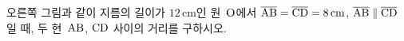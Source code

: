 \noindent\begin{minipage}[t]{0.58\linewidth}\vspace{0pt}\raggedright 오른쪽 그림과 같이 지름의 길이가 $12\,\mathrm{cm}$인 원~$\mathrm{O}$에서 $\overline{\mathrm{AB}}=\overline{\mathrm{CD}}=8\,\mathrm{cm}$, $\overline{\mathrm{AB}}\parallel\overline{\mathrm{CD}}$일 때, 두 현~$\mathrm{AB}$, $\mathrm{CD}$ 사이의 거리를 구하시오.\end{minipage}\hfill\begin{minipage}[t]{0.4\linewidth}\vspace{0pt}\centering \resizebox{\ifdim\width>\linewidth\linewidth\else\width\fi}{!}{}\end{minipage}\par
